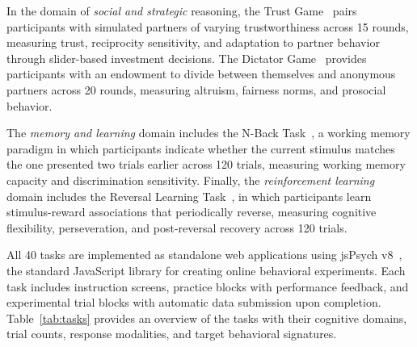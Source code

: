 \documentclass{article}
\begin{document}
In the domain of \emph{social and strategic} reasoning, the Trust Game~\citep{berg1995trust} pairs participants with simulated partners of varying trustworthiness across 15 rounds, measuring trust, reciprocity sensitivity, and adaptation to partner behavior through slider-based investment decisions. The Dictator Game~\citep{kahneman1986fairness, engel2011dictator} provides participants with an endowment to divide between themselves and anonymous partners across 20 rounds, measuring altruism, fairness norms, and prosocial behavior.

The \emph{memory and learning} domain includes the N-Back Task~\citep{kirchner1958nback, owen2005nback}, a working memory paradigm in which participants indicate whether the current stimulus matches the one presented two trials earlier across 120 trials, measuring working memory capacity and discrimination sensitivity. Finally, the \emph{reinforcement learning} domain includes the Reversal Learning Task~\citep{clark2004reversal}, in which participants learn stimulus-reward associations that periodically reverse, measuring cognitive flexibility, perseveration, and post-reversal recovery across 120 trials.

All 40 tasks are implemented as standalone web applications using jsPsych v8~\citep{deleeuw2015jspsych, deleeuw2023jspsych}, the standard JavaScript library for creating online behavioral experiments. Each task includes instruction screens, practice blocks with performance feedback, and experimental trial blocks with automatic data submission upon completion. Table~\ref{tab:tasks} provides an overview of the tasks with their cognitive domains, trial counts, response modalities, and target behavioral signatures.
\end{document}
